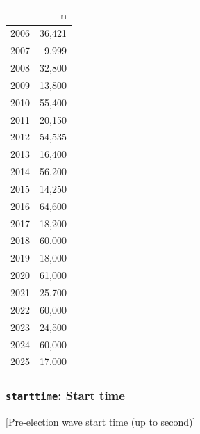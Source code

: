\documentclass[10pt,article,oneside]{memoir}
\begin{document}
\begin{table}[H]
\centering
\begin{tabular}[t]{lr}
\toprule
 & n\\
\midrule
2006 & 36,421\\
2007 & 9,999\\
2008 & 32,800\\
2009 & 13,800\\
2010 & 55,400\\
2011 & 20,150\\
2012 & 54,535\\
2013 & 16,400\\
2014 & 56,200\\
2015 & 14,250\\
2016 & 64,600\\
2017 & 18,200\\
2018 & 60,000\\
2019 & 18,000\\
2020 & 61,000\\
2021 & 25,700\\
2022 & 60,000\\
2023 & 24,500\\
2024 & 60,000\\
2025 & 17,000\\
\bottomrule
\end{tabular}
\end{table}

\subsubsection{\texorpdfstring{\texttt{starttime}: Start
time}{starttime: Start time}}\label{starttime-start-time}

{[}Pre-election wave start time (up to second){]}
\end{document}
